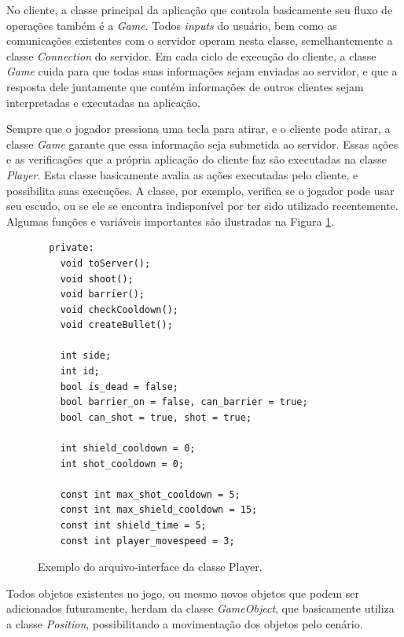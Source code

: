 No cliente, a classe principal da aplicação que controla basicamente seu fluxo de operações também é a \textit{Game}. Todos \textit{inputs} do usuário, bem como as comunicações existentes com o servidor operam nesta classe, semelhantemente a classe \textit{Connection} do servidor. Em cada ciclo de execução do cliente, a classe \textit{Game} cuida para que todas suas informações sejam enviadas ao servidor, e que a resposta dele juntamente que contém informações de outros clientes sejam interpretadas e executadas na aplicação.

Sempre que o jogador pressiona uma tecla para atirar, e o cliente pode atirar,  a classe \textit{Game} garante que essa informação seja submetida ao servidor. Essas ações e as verificações que a própria aplicação do cliente faz são executadas na classe \textit{Player}. Esta classe basicamente avalia as ações executadas pelo cliente, e possibilita suas execuções. A classe, por exemplo, verifica se o jogador pode usar seu escudo, ou se ele se encontra indisponível por ter sido utilizado recentemente. Algumas funções e variáveis importantes são ilustradas na Figura \ref{fig:clienteCode1}.

\begin{figure}

  \begin{lstlisting}
  private:
    void toServer();
    void shoot();
    void barrier();
    void checkCooldown();
    void createBullet();

    int side;
    int id;
    bool is_dead = false;
    bool barrier_on = false, can_barrier = true;
    bool can_shot = true, shot = true;

    int shield_cooldown = 0;
    int shot_cooldown = 0;

    const int max_shot_cooldown = 5;
    const int max_shield_cooldown = 15;
    const int shield_time = 5;
    const int player_movespeed = 3;
  \end{lstlisting}

  \caption[Exemplo do arquivo-interface da classe Player da aplicação do cliente.]{Exemplo do arquivo-interface da classe Player.}
  \label{fig:clienteCode1}  

\end{figure}

Todos objetos existentes no jogo, ou mesmo novos objetos que podem ser adicionados futuramente, herdam da classe \textit{GameObject}, que basicamente utiliza a classe \textit{Position}, possibilitando a movimentação dos objetos pelo cenário.

